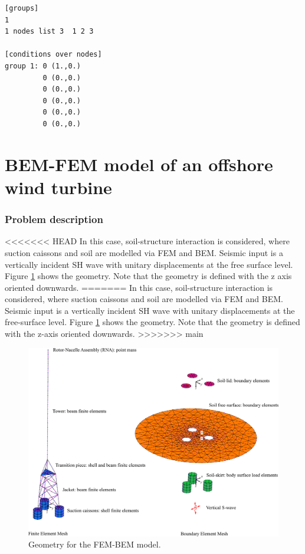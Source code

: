 \documentclass[a4]{article}
\begin{document}
\begin{Verbatim}
[groups]
1
1 nodes list 3  1 2 3 

[conditions over nodes]
group 1: 0 (1.,0.)
         0 (0.,0.)
         0 (0.,0.)
         0 (0.,0.)
         0 (0.,0.)
         0 (0.,0.)
\end{Verbatim}

\part{BEM-FEM model of an offshore wind turbine}

\section{Problem description}

<<<<<<< HEAD
In this case, soil-structure interaction is considered, where suction caissons and soil are modelled via FEM and BEM. Seismic input is a vertically incident SH wave with unitary displacements at the free surface level. Figure \ref{fig:geometry2} shows the geometry. Note that the geometry is defined with the z axis oriented downwards.
=======
In this case, soil-structure interaction is considered, where suction caissons and soil are modelled via FEM and BEM. Seismic input is a vertically incident SH wave with unitary displacements at the free-surface level. Figure \ref{fig:geometry2} shows the geometry. Note that the geometry is defined with the z-axis oriented downwards.
>>>>>>> main

\begin{figure}[tbh!]
	\centering
	\includegraphics[scale=0.35]{owt_model_flexible.pdf}
	\caption{Geometry for the FEM-BEM model.}
	\label{fig:geometry2}
\end{figure}
\end{document}
